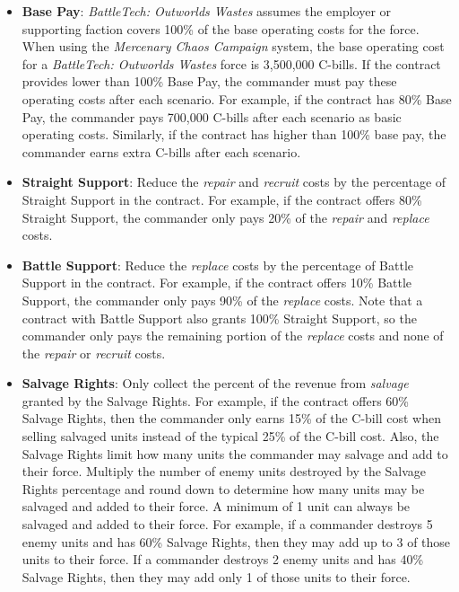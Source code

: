 \begin{itemize}

\item {\bfseries Base Pay}: \emph{BattleTech: Outworlds Wastes} assumes the employer or supporting faction covers 100\% of the base operating costs for the force.
When using the \emph{Mercenary Chaos Campaign} system, the base operating cost for a \emph{BattleTech: Outworlds Wastes} force is 3,500,000 C-bills.
If the contract provides lower than 100\% Base Pay, the commander must pay these operating costs after each scenario.
For example, if the contract has 80\% Base Pay, the commander pays 700,000 C-bills after each scenario as basic operating costs.
Similarly, if the contract has higher than 100\% base pay, the commander earns extra C-bills after each scenario.

\item {\bfseries Straight Support}: Reduce the \emph{repair} and \emph{recruit} costs by the percentage of Straight Support in the contract.
For example, if the contract offers 80\% Straight Support, the commander only pays 20\% of the \emph{repair} and \emph{replace} costs.

\item {\bfseries Battle Support}: Reduce the \emph{replace} costs by the percentage of Battle Support in the contract.
For example, if the contract offers 10\% Battle Support, the commander only pays 90\% of the \emph{replace} costs.
Note that a contract with Battle Support also grants 100\% Straight Support, so the commander only pays the remaining portion of the \emph{replace} costs and none of the \emph{repair} or \emph{recruit} costs.

\item {\bfseries Salvage Rights}: Only collect the percent of the revenue from \emph{salvage} granted by the Salvage Rights.
For example, if the contract offers 60\% Salvage Rights, then the commander only earns 15\% of the C-bill cost when selling salvaged units instead of the typical 25\% of the C-bill cost.
Also, the Salvage Rights limit how many units the commander may salvage and add to their force.
Multiply the number of enemy units destroyed by the Salvage Rights percentage and round down to determine how many units may be salvaged and added to their force.
A minimum of 1 unit can always be salvaged and added to their force.
For example, if a commander destroys 5 enemy units and has 60\% Salvage Rights, then they may add up to 3 of those units to their force.
If a commander destroys 2 enemy units and has 40\% Salvage Rights, then they may add only 1 of those units to their force.


\end{itemize}

